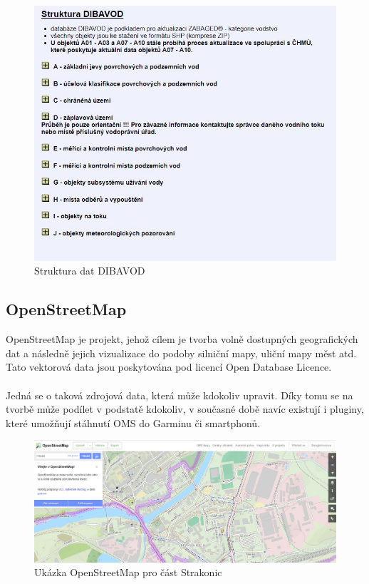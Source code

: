 \documentclass[a4paper, 12pt]{article}
\begin{document}
\begin{figure}[h!]
	\centering
	\includegraphics[width=13cm]{pictures/dibavod.jpg}
	\caption{Struktura dat DIBAVOD}
\end{figure}

\subsection{OpenStreetMap}
OpenStreetMap je projekt, jehož cílem je tvorba volně dostupných geografických dat a následně jejich vizualizace do podoby silniční mapy, uliční mapy měst atd. Tato vektorová data jsou poskytována pod licencí Open Database Licence. \\
\\
Jedná se o taková zdrojová data, která může kdokoliv upravit. Díky tomu se na tvorbě může podílet v podstatě kdokoliv, v současné době navíc existují i pluginy, které umožňují stáhnutí OMS do Garminu či smartphonů. 

\begin{figure}[h!]
	\centering
	\includegraphics[width=14cm]{pictures/osm.jpg}
	\caption{Ukázka OpenStreetMap pro část Strakonic}
\end{figure}
\end{document}

